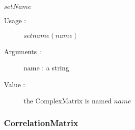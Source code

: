 \begin{description}
\begin{description}
  \item $setName$
    \begin{description}
    \item[Usage :] $setname(name)$
    \item[Arguments :] name : a string
    \item[Value :] the ComplexMatrix is named $name$
    \end{description}
    \bigskip


  \end{description}

\end{description}

\newpage \subsubsection{CorrelationMatrix}

